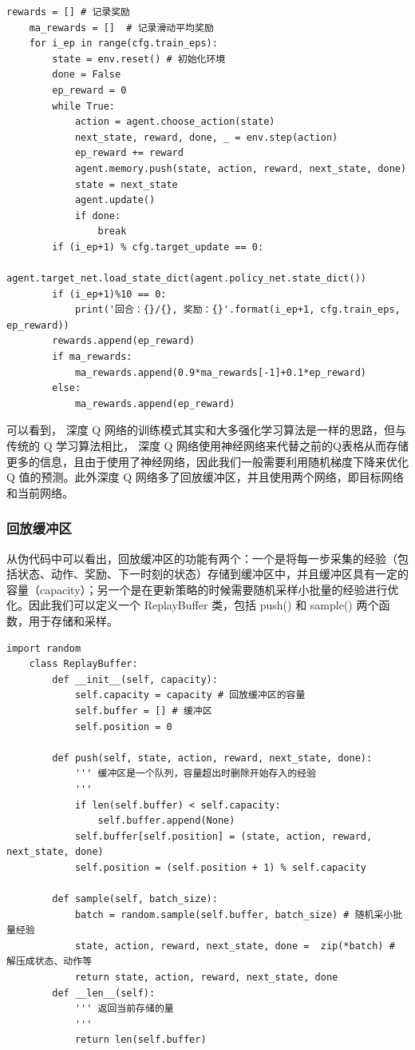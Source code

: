 \begin{lstlisting}[style=Python]
    rewards = [] # 记录奖励
    ma_rewards = []  # 记录滑动平均奖励
    for i_ep in range(cfg.train_eps):
        state = env.reset() # 初始化环境
        done = False
        ep_reward = 0
        while True:
            action = agent.choose_action(state)
            next_state, reward, done, _ = env.step(action)
            ep_reward += reward
            agent.memory.push(state, action, reward, next_state, done)
            state = next_state
            agent.update()
            if done:
                break
        if (i_ep+1) % cfg.target_update == 0:
            agent.target_net.load_state_dict(agent.policy_net.state_dict())
        if (i_ep+1)%10 == 0:
            print('回合：{}/{}, 奖励：{}'.format(i_ep+1, cfg.train_eps, ep_reward))
        rewards.append(ep_reward)
        if ma_rewards:
            ma_rewards.append(0.9*ma_rewards[-1]+0.1*ep_reward)
        else:
            ma_rewards.append(ep_reward)
\end{lstlisting}

可以看到， 深度 Q 网络的训练模式其实和大多强化学习算法是一样的思路，但与传统的 Q 学习算法相比， 深度 Q 网络使用神经网络来代替之前的Q表格从而存储更多的信息，且由于使用了神经网络，因此我们一般需要利用随机梯度下降来优化 Q 值的预测。此外深度 Q 网络多了回放缓冲区，并且使用两个网络，即目标网络和当前网络。

\subsubsection{回放缓冲区} 

从伪代码中可以看出，回放缓冲区的功能有两个：一个是将每一步采集的经验（包括状态、动作、奖励、下一时刻的状态）存储到缓冲区中，并且缓冲区具有一定的容量（capacity）；另一个是在更新策略的时候需要随机采样小批量的经验进行优化。因此我们可以定义一个 ReplayBuffer 类，包括 push() 和 sample() 两个函数，用于存储和采样。

\begin{lstlisting}[style=Python]
    import random
    class ReplayBuffer:
        def __init__(self, capacity):
            self.capacity = capacity # 回放缓冲区的容量
            self.buffer = [] # 缓冲区
            self.position = 0 
        
        def push(self, state, action, reward, next_state, done):
            ''' 缓冲区是一个队列，容量超出时删除开始存入的经验
            '''
            if len(self.buffer) < self.capacity:
                self.buffer.append(None)
            self.buffer[self.position] = (state, action, reward, next_state, done)
            self.position = (self.position + 1) % self.capacity 
        
        def sample(self, batch_size):
            batch = random.sample(self.buffer, batch_size) # 随机采小批量经验
            state, action, reward, next_state, done =  zip(*batch) # 解压成状态、动作等
            return state, action, reward, next_state, done
        def __len__(self):
            ''' 返回当前存储的量
            '''
            return len(self.buffer)
\end{lstlisting}

